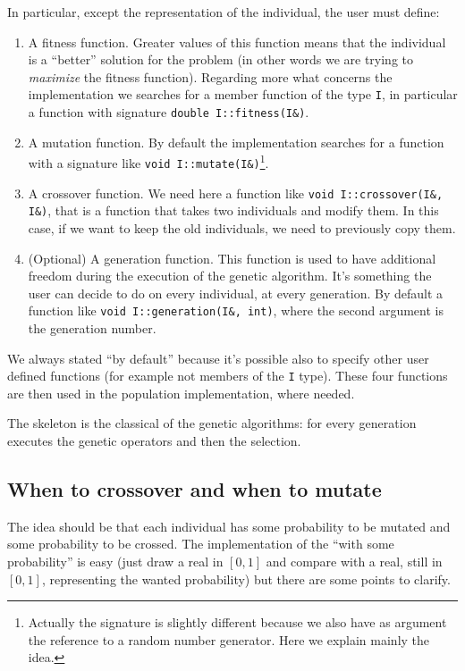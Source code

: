 \documentclass{report}
\begin{document}
In particular, except the representation of the individual, the user must define:

\begin{enumerate}
\item A fitness function. Greater values of this function means that the individual is a ``better'' solution for the problem (in other words we are trying to \textit{maximize} the fitness function). Regarding more what concerns the implementation we searches for a member function of the type \texttt{I}, in particular a function with signature \texttt{double I::fitness(I\&)}.

\item A mutation function. By default the implementation searches for a function with a signature like \texttt{void I::mutate(I\&)}\footnote{Actually the signature is slightly different because we also have as argument the reference to a random number generator. Here we explain mainly the idea.}.

\item A crossover function. We need here a function like \texttt{void I::crossover(I\&, I\&)}, that is a function that takes two individuals and modify them. In this case, if we want to keep the old individuals, we need to previously copy them.

\item (Optional) A generation function. This function is used to have additional freedom during the execution of the genetic algorithm. It's something the user can decide to do on every individual, at every generation. By default a function like \texttt{void I::generation(I\&, int)}, where the second argument is the generation number.
\end{enumerate}

We always stated ``by default'' because it's possible also to specify other user defined functions (for example not members of the \texttt{I} type). These four functions are then used in the population implementation, where needed.

The skeleton is the classical of the genetic algorithms: for every generation executes the genetic operators and then the selection.

\subsection{When to crossover and when to mutate}

The idea should be that each individual has some probability to be mutated and some probability to be crossed. The implementation of the ``with some probability'' is easy (just draw a real in $[0,1]$ and compare with a real, still in $[0,1]$, representing the wanted probability) but there are some points to clarify.
\end{document}
